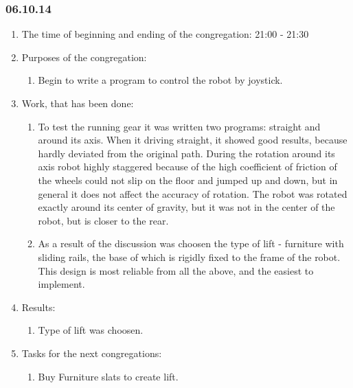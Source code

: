 \textsl{}
\subsubsection{06.10.14}

\begin{enumerate}
	\item The time of beginning and ending of the congregation:
	21:00 - 21:30
	\item Purposes of the congregation:
	\begin{enumerate}
	  \item Begin to write a program to control the robot by joystick.
	  
    \end{enumerate}
	\item Work, that has been done:
	\begin{enumerate}
	  \item To test the running gear it was written two programs: straight and around its axis. When it driving straight, it showed good results, because hardly deviated from the original path. During the rotation around its axis robot highly staggered because of the high coefficient of friction of the wheels could not slip on the floor and jumped up and down, but in general it does not affect the accuracy of rotation. The robot was rotated exactly around its center of gravity, but it was not in the center of the robot, but is closer to the rear.
      
      \item  As a result of the discussion was choosen the type of lift - furniture with sliding rails, the base of which is rigidly fixed to the frame of the robot. This design is most reliable from all the above, and the easiest to implement.
      
    \end{enumerate}
    
	\item Results: 
	\begin{enumerate}
      \item  Type of lift was choosen.

    \end{enumerate}
    
	\item Tasks for the next congregations:
	\begin{enumerate}
	  \item Buy Furniture slats to create lift.

    \end{enumerate}     
\end{enumerate}
\fillpage
